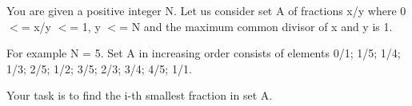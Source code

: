You are given a positive integer N. Let us consider set A of fractions x/y where 0 $<$= x/y $<$= 1, y $<$= N and the maximum common divisor of x and y is 1. 



 For example N = 5. Set A in increasing order consists of elements 0/1; 1/5; 1/4; 1/3; 2/5; 1/2; 3/5; 2/3; 3/4; 4/5; 1/1.



 Your task is to find the i-th smallest fraction in set A.